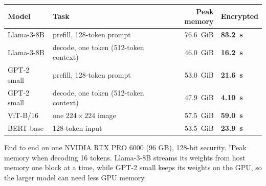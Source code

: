\documentclass[border={14pt 4pt 14pt 4pt},varwidth=17.2cm,multi=tbl]{standalone}
\newcommand{\llamapf}{83.2}\newcommand{\llamadec}{16.2}\newcommand{\gptpf}{21.6}\newcommand{\gptdec}{4.10}
\newcommand{\vitimg}{59.0}\newcommand{\bertin}{23.9}
\newcommand{\llamapfmem}{76.6}\newcommand{\llamadecmem}{46.0}\newcommand{\gptpfmem}{53.0}\newcommand{\gptdecmem}{47.9}
\newcommand{\vitmem}{57.5}\newcommand{\bertmem}{53.5}
\newcommand{\nt}[1]{\rlap{$^{#1}$}}
\newcommand{\tcap}[1]{\par\vspace{6pt}\begin{minipage}{\linewidth}\fontsize{11.5}{14.5}\selectfont #1\end{minipage}}
\newenvironment{tbl}{\centering\setlength{\tabcolsep}{7pt}\renewcommand{\arraystretch}{1.18}}{}
\begin{document}
\begin{tbl}
\renewcommand{\arraystretch}{1.3}\setlength{\aboverulesep}{0pt}\setlength{\belowrulesep}{0pt}\setlength{\extrarowheight}{2pt}
\begin{tabularx}{\linewidth}{lL{1}rP}
\toprule
\textbf{Model} & \textbf{Task} & \textbf{Peak memory} & \textbf{Encrypted} \\
\midrule
Llama-3-8B & prefill, 128-token prompt & \llamapfmem\ GiB & \textbf{\llamapf\ s} \\
Llama-3-8B & decode, one token (512-token context) & \llamadecmem\ GiB\nt{\dagger} & \textbf{\llamadec\ s} \\
GPT-2 small & prefill, 128-token prompt & \gptpfmem\ GiB & \textbf{\gptpf\ s} \\
GPT-2 small & decode, one token (512-token context) & \gptdecmem\ GiB\nt{\dagger} & \textbf{\gptdec\ s} \\
ViT-B/16 & one $224\times224$ image & \vitmem\ GiB & \textbf{\vitimg\ s} \\
BERT-base & 128-token input & \bertmem\ GiB & \textbf{\bertin\ s} \\
\bottomrule
\end{tabularx}
\tcap{End to end on one NVIDIA RTX PRO 6000 (96 GB), 128-bit security. $^\dagger$Peak memory when decoding 16 tokens.
Llama-3-8B streams its weights from host memory one block at a time, while GPT-2 small keeps its weights on the GPU, so
the larger model can need less GPU memory.}
\end{tbl}
\end{document}
